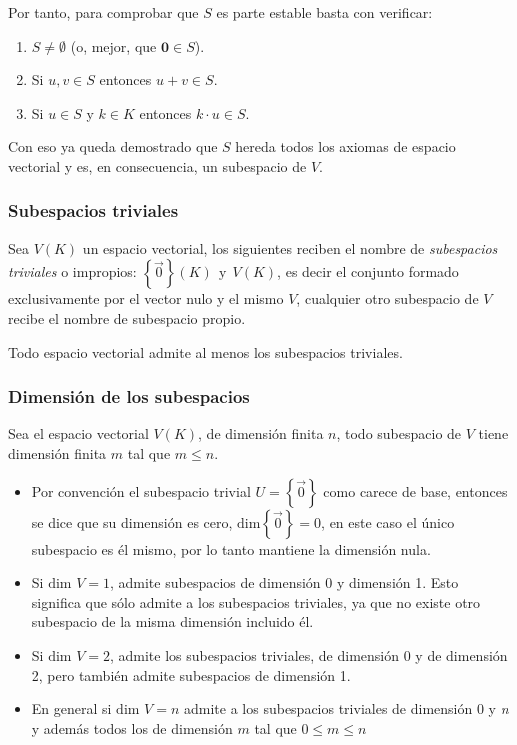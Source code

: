 Por tanto, para comprobar que \(S\) es parte estable basta con verificar:
\begin{enumerate}
  \item \(S\neq\emptyset\) (o, mejor, que \(\mathbf{0}\in S\)).
  \item Si \(u,v\in S\) entonces \(u+v\in S\).
  \item Si \(u\in S\) y \(k\in K\) entonces \(k\cdot u\in S\).
\end{enumerate}

Con eso ya queda demostrado que \(S\) hereda todos los axiomas de espacio vectorial y es, en consecuencia, un subespacio de \(V\).


\subsubsection{Subespacios triviales}

Sea \(V(K)\) un espacio vectorial, los siguientes reciben el nombre de \textit{subespacios triviales} o impropios: \(\left\{\vec{0}\right\} (K) ~~ \text{y} ~~ V(K)\), es decir el conjunto formado exclusivamente por el vector nulo y el mismo \(V\), cualquier otro subespacio de \(V\) recibe el nombre de subespacio propio.

Todo espacio vectorial admite al menos los subespacios triviales.

\subsubsection{Dimensión de los subespacios}

Sea el espacio vectorial \(V(K)\), de dimensión finita \(n\), todo subespacio de \(V\) tiene dimensión finita \(m\) tal que \(m \leq n\).

\begin{itemize}
  \item Por convención el subespacio trivial \(U=\left\{\vec{0}\right\}\) como carece de base, entonces se dice que su dimensión es cero, \(\text{dim}\left\{\vec{0}\right\}=0\), en este caso el único subespacio es él mismo, por lo tanto mantiene la dimensión nula.
  \item Si \(\text{dim }V=1\), admite subespacios de dimensión 0 y dimensión 1. Esto significa que sólo admite a los subespacios triviales, ya que no existe otro subespacio de la misma dimensión incluido él.
  \item Si \(\text{dim }V = 2\), admite los subespacios triviales, de dimensión 0 y de dimensión 2, pero también admite subespacios de dimensión 1.
  \item En general si \(\text{dim }V=n\) admite a los subespacios triviales de dimensión 0 y \textit{n} y además todos los de dimensión \(m\) tal que \(0 \leq m \leq n\)
\end{itemize}